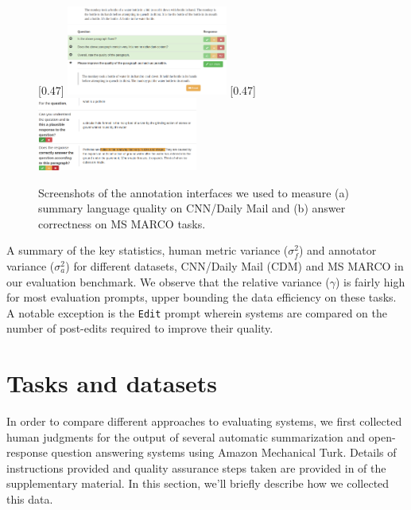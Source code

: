 \begin{figure}[t]
  \centering
  [0.47\linewidth]{%
    \includegraphics[width=0.47\textwidth]{figures/edit.png}
  }\hfill
  [0.47\linewidth]{%
    \includegraphics[width=0.47\textwidth]{figures/qa.png}
  }
  \caption{\label{fig:tasks} Screenshots of the annotation interfaces we used to measure (a) summary language quality on CNN/Daily Mail and (b) answer correctness on MS MARCO tasks.
  }
\end{figure}

\begin{table}[t]
  \centering
  
  \caption{\label{tab:dataset} A summary of the key statistics, human metric variance ($\sigma^2_f$) and annotator variance ($\sigma^2_a$) for different datasets, CNN/Daily Mail (CDM) and MS MARCO in our evaluation benchmark.
  We observe that the relative variance ($\gamma$) is fairly high for most evaluation prompts, upper bounding the data efficiency on these tasks.
  A notable exception is the \texttt{Edit} prompt wherein systems are compared on the number of post-edits required to improve their quality.
  }
\end{table}

\section{\label{sec:tasks} Tasks and datasets}

In order to compare different approaches to evaluating systems, we first collected human judgments for the output of several automatic summarization and open-response question answering systems using Amazon Mechanical Turk.
Details of instructions provided and quality assurance steps taken are provided in  of the supplementary material.
In this section, we'll briefly describe how we collected this data.

